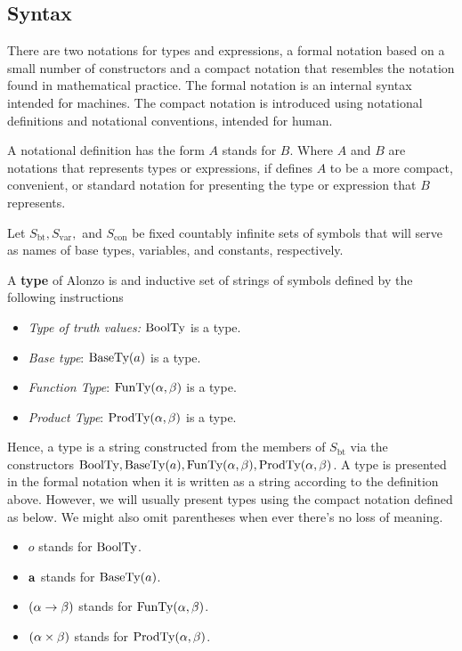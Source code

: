 \subsection{Syntax}\label{subsec:syntax}
There are two notations for types and expressions, a formal notation based on a small number of constructors and a compact notation that resembles the notation found in mathematical practice.
The formal notation is an internal syntax intended for machines.
The compact notation is introduced using notational definitions and notational conventions, intended for human.

A notational definition has the form $A$ stands for $B$.
Where $A$ and $B$ are notations that represents types or expressions, if defines $A$ to be a more compact, convenient, or standard notation for presenting the type or expression that $B$ represents.

\begin{define}
    Let $S_{\text{bt}}, S_{\text{var}},$ and $S_{\text{con}}$ be fixed countably infinite sets of symbols that will serve as names of base types, variables, and constants, respectively.
\end{define}

\begin{define}
    A \textbf{type} of Alonzo is and inductive set of strings of symbols defined by the following instructions
    \begin{itemize}
        \item \textit{Type of truth values:} $\text{BoolTy}$ is a type.
        \item \textit{Base type}: $\text{BaseTy}(a)$ is a type.
        \item \textit{Function Type}: $\text{FunTy}(\alpha, \beta)$ is a type.
        \item \textit{Product Type}: $\text{ProdTy}(\alpha, \beta)$ is a type.
    \end{itemize}
\end{define}
Hence, a type is a string constructed from the members of $S_{\text{bt}}$ via the constructors $\text{BoolTy}, \text{BaseTy}(a), \text{FunTy}(\alpha, \beta), \text{ProdTy}(\alpha, \beta)$.
A type is presented in the formal notation when it is written as a string according to the definition above.
However, we will usually present types using the compact notation defined as below.
We might also omit parentheses when ever there's no loss of meaning.
\begin{itemize}
    \item $o$ stands for $\text{BoolTy}$.
    \item $\bold{a}$ stands for $\text{BaseTy}(a)$.
    \item $(\alpha \rightarrow \beta)$ stands for $\text{FunTy}(\alpha, \beta)$.
    \item $(\alpha \times \beta)$ stands for $\text{ProdTy}(\alpha, \beta)$.
\end{itemize}

